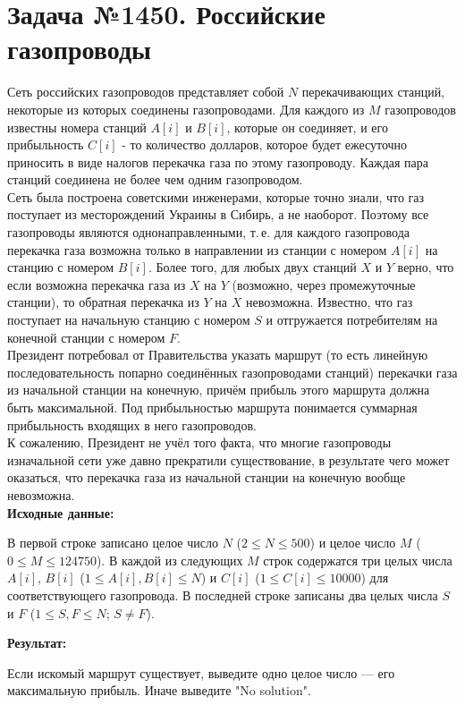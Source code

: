 \documentclass[a4paper,12pt]{article}
\begin{document}
\section*{Задача №1450. Российские газопроводы}
Сеть российских газопроводов представляет собой $N$ перекачивающих станций, некоторые из которых соединены газопроводами. Для каждого из $M$ газопроводов известны номера станций $A[i]$ и $B[i]$, которые он соединяет, и его прибыльность $C[i]$ - то количество долларов, которое будет ежесуточно приносить в виде налогов перекачка газа по этому газопроводу. Каждая пара станций соединена не более чем одним газопроводом.\\[0.5em]
Сеть была построена советскими инженерами, которые точно знали, что газ поступает из месторождений Украины в Сибирь, а не наоборот. Поэтому все газопроводы являются однонаправленными, т.\,е. для каждого газопровода перекачка газа возможна только в направлении из станции с номером $A[i]$ на станцию с номером $B[i]$. Более того, для любых двух станций $X$ и $Y$ верно, что если возможна перекачка газа из $X$ на $Y$ (возможно, через промежуточные станции), то обратная перекачка из $Y$ на $X$ невозможна. Известно, что газ поступает на начальную станцию с номером $S$ и отгружается потребителям на конечной станции с номером $F$.\\[0.5em]
Президент потребовал от Правительства указать маршрут (то есть линейную последовательность попарно соединённых газопроводами станций) перекачки газа из начальной станции на конечную, причём прибыль этого маршрута должна быть максимальной. Под прибыльностью маршрута понимается суммарная прибыльность входящих в него газопроводов.\\[0.5em]
К сожалению, Президент не учёл того факта, что многие газопроводы изначальной сети уже давно прекратили существование, в результате чего может оказаться, что перекачка газа из начальной станции на конечную вообще невозможна.\\[1em]
\textbf{Исходные данные:}
\begin{quotebox}
    В первой строке записано целое число $N$ ($2 \le N \le 500$) и целое число $M$ ($0 \le M \le 124750$). В каждой из следующих $M$ строк содержатся три целых числа $A[i]$, $B[i]$ ($1 \le A[i], B[i] \le N$) и $C[i]$ ($1 \le C[i] \le 10000$) для соответствующего газопровода. В последней строке записаны два целых числа $S$ и $F$ ($1 \le S, F \le N$; $S \neq F$).
\end{quotebox}
\textbf{Результат:}
\begin{quotebox}
    Если искомый маршрут существует, выведите одно целое число — его максимальную прибыль. Иначе выведите "No solution". 
\end{quotebox}
\end{document}
